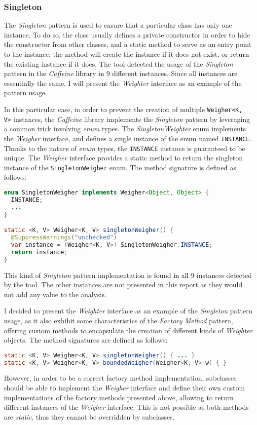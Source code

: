 \subsubsection{Singleton}

The \textit{Singleton} pattern is used to ensure that a particular class has only one instance. To do so, the class usually defines a private constructor in order to hide the constructor from other classes, and a static method to serve as an entry point to the instance: the method will create the instance if it does not exist, or return the existing instance if it does. The tool detected the usage of the \textit{Singleton} pattern in the \textit{Caffeine} library in 9 different instances. Since all instances are essentially the same, I will present the \textit{Weighter} interface as an example of the pattern usage.

In this particular case, in order to prevent the creation of multiple \texttt{Weigher<K, V>} instances, the \textit{Caffeine} library implements the \textit{Singleton} pattern by leveraging a common trick involving \textit{enum} types. The \textit{SingletonWeighter} enum implements the \textit{Weigher} interface, and defines a single instance of the enum named \texttt{INSTANCE}. Thanks to the nature of \textit{enum} types, the \texttt{INSTANCE} instance is guaranteed to be unique. The \textit{Weigher} interface provides a static method to return the singleton instance of the \texttt{SingletonWeigher} enum. The method signature is defined as follows:

\begin{lstlisting}[language=Java]
enum SingletonWeigher implements Weigher<Object, Object> {
  INSTANCE;
  ...
}

static <K, V> Weigher<K, V> singletonWeigher() {
  @SuppressWarnings("unchecked")
  var instance = (Weigher<K, V>) SingletonWeigher.INSTANCE;
  return instance;
}
\end{lstlisting}

\noindent This kind of \textit{Singleton} pattern implementation is found in all 9 instances detected by the tool. The other instances are not presented in this report as they would not add any value to the analysis.

I decided to present the \textit{Weighter} interface as an example of the \textit{Singleton} pattern usage, as it also exhibit some characteristics of the \textit{Factory Method} pattern, offering custom methods to encapsulate the creation of different kinds of \textit{Weighter} objects. The method signatures are defined as follows:

\begin{lstlisting}[language=Java]
static <K, V> Weigher<K, V> singletonWeigher() { ... }
static <K, V> Weigher<K, V> boundedWeigher(Weigher<K, V> w) { }
\end{lstlisting}

\noindent However, in order to be a correct factory method implementation, subclasses should be able to implement the \textit{Weigher} interface and define their own custom implementations of the factory methods presented above, allowing to return different instances of the \textit{Weigher} interface. This is not possible as both methods are \textit{static}, thus they cannot be overridden by subclasses.
